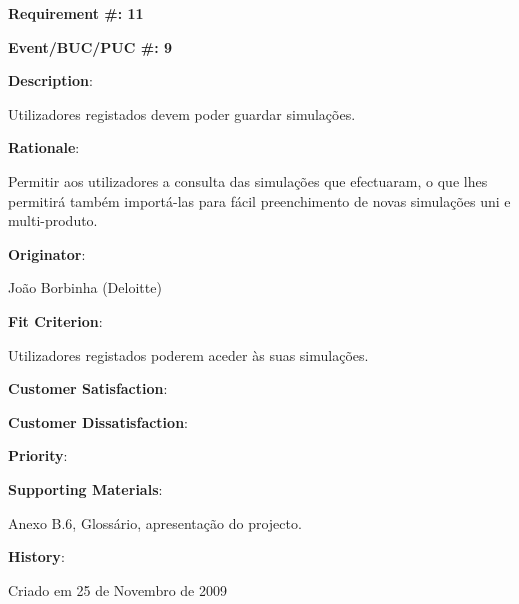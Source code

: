 \pagebreak

\begin{minipage}{0.55\textwidth}
\begin{flushleft}\textbf{Requirement \#: 11}\end{flushleft}
\end{minipage}
\begin{minipage}{0.4\textwidth}
\begin{flushright}\textbf{Event/BUC/PUC \#: 9}\end{flushright}
\end{minipage}

\begin{description}
\item \textbf{Description}:

Utilizadores registados devem poder guardar simulações.\\

\item \textbf{Rationale}:

Permitir aos utilizadores a consulta das simulações que efectuaram, o que lhes permitirá também importá-las para fácil preenchimento de novas simulações uni e multi-produto.\\

\item \textbf{Originator}:

João Borbinha (Deloitte)\\

\item \textbf{Fit Criterion}:

Utilizadores registados poderem aceder às suas  simulações.\\

\begin{minipage}{0.45\textwidth}
\begin{flushleft}\item \textbf{Customer Satisfaction}:\end{flushleft}
\end{minipage}
\begin{minipage}{0.45\textwidth}
\begin{flushleft}\item \textbf{Customer Dissatisfaction}:\end{flushleft}
\end{minipage}

\item \textbf{Priority}:\\

\item \textbf{Supporting Materials}:

Anexo B.6, Glossário, apresentação do projecto.\\

\item \textbf{History}:

Criado em 25 de Novembro de 2009\\
\end{description}

